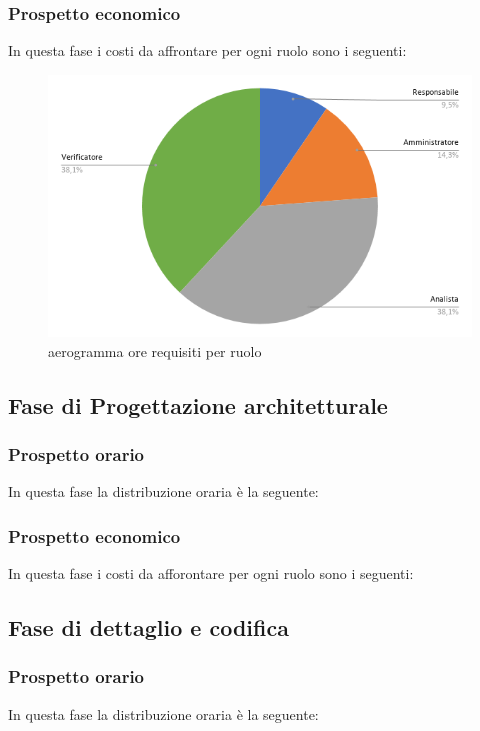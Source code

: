 \subsubsection{Prospetto economico}
In questa fase i costi da affrontare per ogni ruolo sono i seguenti:

\begin{figure}[!ht]
    \caption{aerogramma ore requisiti per ruolo}
    \vspace{5px}
    \includegraphics[scale=0.5]{../../../Images/Diagrammi/Diagramma a torta/ore requisiti.png}
    \centering
\end{figure}
\subsection{Fase di Progettazione architetturale}
    \subsubsection{Prospetto orario}
    In questa fase la distribuzione oraria è la seguente:
    \subsubsection{Prospetto economico}
    In questa fase i costi da afforontare per ogni ruolo sono i seguenti:
\subsection{Fase di dettaglio e codifica}
    \subsubsection{Prospetto orario}
    In questa fase la distribuzione oraria è la seguente:
